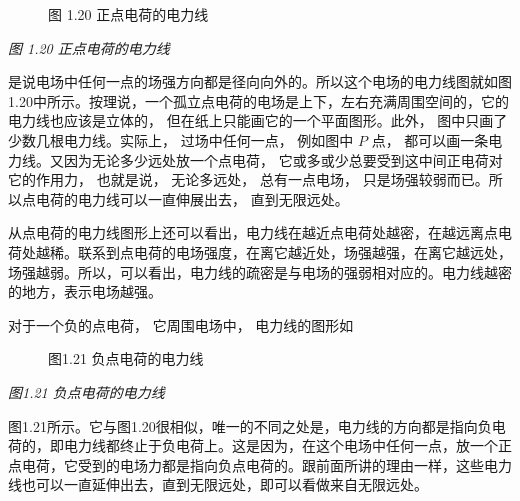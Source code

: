 \begin{figure}
\centering
{}
\caption{图 1.20 正点电荷的电力线}
\end{figure}

\emph{图 1.20 正点电荷的电力线}

是说电场中任何一点的场强方向都是径向向外的。所以这个电场的电力线图就如图1.20中所示。按理说，一个孤立点电荷的电场是上下，左右充满周围空间的，它的电力线也应该是立体的，
但在纸上只能画它的一个平面图形。此外，
图中只画了少数几根电力线。实际上， 过场中任何一点， 例如图中 \(P\) 点，
都可以画一条电力线。又因为无论多少远处放一个点电荷，
它或多或少总要受到这中间正电荷对它的作用力， 也就是说， 无论多远处，
总有一点电场， 只是场强较弱而已。所以点电荷的电力线可以一直伸展出去，
直到无限远处。

从点电荷的电力线图形上还可以看出，电力线在越近点电荷处越密，在越远离点电荷处越稀。联系到点电荷的电场强度，在离它越近处，场强越强，在离它越远处，场强越弱。所以，可以看出，电力线的疏密是与电场的强弱相对应的。电力线越密的地方，表示电场越强。

对于一个负的点电荷， 它周围电场中， 电力线的图形如

\begin{figure}
\centering
{}
\caption{图1.21 负点电荷的电力线}
\end{figure}

\emph{图1.21 负点电荷的电力线}

图1.21所示。它与图1.20很相似，唯一的不同之处是，电力线的方向都是指向负电荷的，即电力线都终止于负电荷上。这是因为，在这个电场中任何一点，放一个正点电荷，它受到的电场力都是指向负点电荷的。跟前面所讲的理由一样，这些电力线也可以一直延伸出去，直到无限远处，即可以看做来自无限远处。

